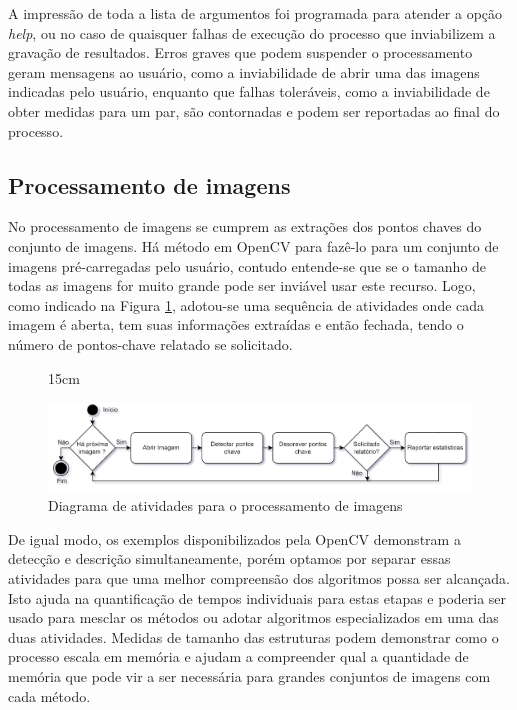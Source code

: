 A impressão de toda a lista de argumentos foi programada para atender a opção \textit{help}, ou no caso de quaisquer falhas de execução do processo que inviabilizem a gravação de resultados. Erros graves que podem suspender o processamento geram mensagens ao usuário, como a inviabilidade de abrir uma das imagens indicadas pelo usuário, enquanto que falhas toleráveis, como a inviabilidade de obter medidas para um par, são contornadas e podem ser reportadas ao final do processo.



\subsection{Processamento de imagens}

No processamento de imagens se cumprem as extrações dos pontos chaves do conjunto de imagens. Há método em OpenCV para fazê-lo para um conjunto de imagens pré-carregadas pelo usuário, contudo entende-se que se o tamanho de todas as imagens for muito grande pode ser inviável usar este recurso. Logo, como indicado na Figura \ref{fl:imagens}, adotou-se uma sequência de atividades onde cada imagem é aberta, tem suas informações extraídas e então fechada, tendo o número de pontos-chave relatado se solicitado. 

\begin{figure}[!h]{15cm}
  \caption{Diagrama de atividades para o processamento de imagens} \label{fl:imagens}
  \includegraphics[width=\hsize]{figuras/Fluxo_Imagem.png}
\end{figure}

De igual modo, os exemplos disponibilizados pela OpenCV demonstram a detecção e descrição simultaneamente, porém optamos por separar essas atividades para que uma melhor compreensão dos algoritmos possa ser alcançada. Isto ajuda na quantificação de tempos individuais para estas etapas e poderia ser usado para mesclar os métodos ou adotar algoritmos especializados em uma das duas atividades. Medidas de tamanho das estruturas podem demonstrar como o processo escala em memória e ajudam a compreender qual a quantidade de memória que pode vir a ser necessária para grandes conjuntos de imagens com cada método.



